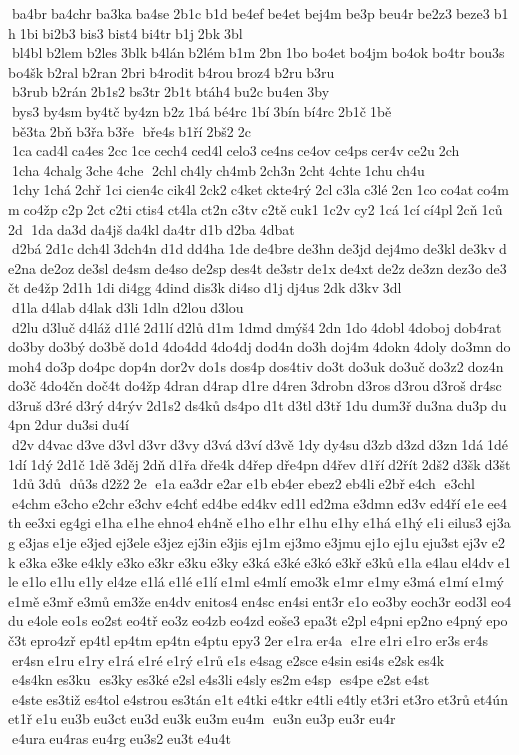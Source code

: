  ba4br ba4chr ba3ka ba4se 2b1c b1d be4ef be4et bej4m be3p beu4r be2z3 beze3 b1h 1bi bi2b3 bis3 bist4 bi4tr b1j 2bk 3bl  bl4bl b2lem b2les 3blk b4lán b2lém b1m 2bn 1bo bo4et bo4jm bo4ok bo4tr bou3s bo4šk b2ral b2ran 2bri b4rodit b4rou broz4 b2ru b3ru  b3rub b2rán 2b1s2 bs3tr 2b1t btáh4 bu2c bu4en 3by  bys3 by4sm by4tč by4zn b2z 1bá bé4rc 1bí 3bín bí4rc 2b1č 1bě  bě3ta 2bň b3řa b3ře  bře4s b1ří 2bš2 2c  1ca cad4l ca4es 2cc 1ce cech4 ced4l celo3 ce4ns ce4ov ce4ps cer4v ce2u 2ch  1cha 4chalg 3che 4che  2chl ch4ly ch4mb 2ch3n 2cht 4chte 1chu ch4u  1chy 1chá 2chř 1ci cien4c cik4l 2ck2 c4ket ckte4rý 2cl c3la c3lé 2cn 1co co4at co4mm co4žp c2p 2ct c2ti ctis4 ct4la ct2n c3tv c2tě cuk1 1c2v cy2 1cá 1cí cí4pl 2cň 1ců 2d  1da da3d da4jš da4kl da4tr d1b d2ba 4dbat  d2bá 2d1c dch4l 3dch4n d1d dd4ha 1de de4bre de3hn de3jd dej4mo de3kl de3kv de2na de2oz de3sl de4sm de4so de2sp des4t de3str de1x de4xt de2z de3zn dez3o de3čt de4žp 2d1h 1di di4gg 4dind dis3k di4so d1j dj4us 2dk d3kv 3dl  d1la d4lab d4lak d3li 1dln d2lou d3lou  d2lu d3luč d4láž d1lé 2d1lí d2lů d1m 1dmd dmýš4 2dn 1do 4dobl 4doboj dob4rat do3by do3bý do3bě do1d 4do4dd 4do4dj dod4n do3h doj4m 4dokn 4doly do3mn domoh4 do3p do4pc dop4n dor2v do1s dos4p dos4tiv do3t do3uk do3uč do3z2 doz4n do3č 4do4čn doč4t do4žp 4dran d4rap d1re d4ren 3drobn d3ros d3rou d3roš dr4sc d3ruš d3ré d3rý d4rýv 2d1s2 ds4ků ds4po d1t d3tl d3tř 1du dum3ř du3na du3p du4pn 2dur du3si du4í  d2v d4vac d3ve d3vl d3vr d3vy d3vá d3ví d3vě 1dy dy4su d3zb d3zd d3zn 1dá 1dé 1dí 1dý 2d1č 1dě 3děj 2dň d1řa dře4k d4řep dře4pn d4řev d1ří d2řít 2dš2 d3šk d3št 1dů 3dů  dů3s d2ž2 2e  e1a ea3dr e2ar e1b eb4er ebez2 eb4li e2bř e4ch  e3chl  e4chm e3cho e2chr e3chv e4chť ed4be ed4kv ed1l ed2ma e3dmn ed3v ed4ří e1e ee4th ee3xi eg4gi e1ha e1he ehno4 eh4ně e1ho e1hr e1hu e1hy e1há e1hý e1i eilus3 ej3ag e3jas e1je e3jed ej3ele e3jez ej3in e3jis ej1m ej3mo e3jmu ej1o ej1u eju3st ej3v e2k e3ka e3ke e4kly e3ko e3kr e3ku e3ky e3ká e3ké e3kó e3kř e3ků e1la e4lau el4dv e1le e1lo e1lu e1ly el4ze e1lá e1lé e1lí e1ml e4mlí emo3k e1mr e1my e3má e1mí e1mý e1mě e3mř e3mů em3že en4dv enitos4 en4sc en4si ent3r e1o eo3by eoch3r eod3l eo4du e4ole eo1s eo2st eo4tř eo3z eo4zb eo4zd eoše3 epa3t e2pl e4pni ep2no e4pný epoč3t epro4zř ep4tl ep4tm ep4tn e4ptu epy3 2er e1ra er4a  e1re e1ri e1ro er3s er4s  er4sn e1ru e1ry e1rá e1ré e1rý e1rů e1s e4sag e2sce e4sin esi4s e2sk es4k  e4s4kn es3ku  es3ky es3ké e2sl e4s3li e4sly es2m e4sp  es4pe e2st e4st  e4ste es3tiž es4tol e4strou es3tán e1t e4tki e4tkr e4tli e4tly et3ri et3ro et3rů et4ún et1ř e1u eu3b eu3ct eu3d eu3k eu3m eu4m  eu3n eu3p eu3r eu4r  e4ura eu4ras eu4rg eu3s2 eu3t e4u4t 